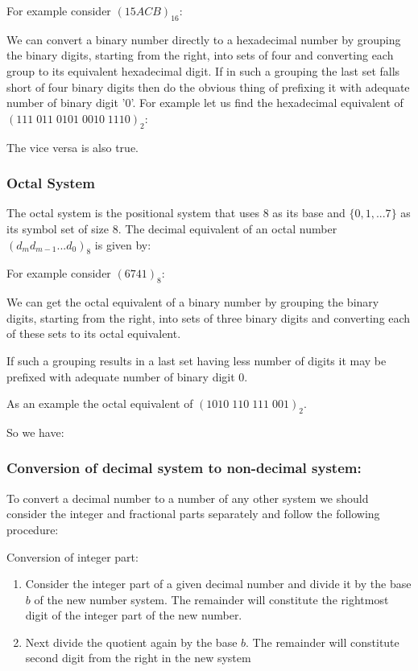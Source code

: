 	 For example consider $(15ACB)_{16}$:
	
	We can convert a binary number directly to a hexadecimal number by grouping the binary digits, starting from the right, into sets of four and converting each group to its equivalent hexadecimal digit. If in such a grouping the last set falls short of four binary digits then do the obvious thing of prefixing it with adequate number of binary digit '$0$'. For example let us find the 	hexadecimal equivalent of $(111\;011\;0101\;0010\;1110)_{2}$:
	
	The vice versa is also true.
	
	\subsubsection{Octal System}  
	The octal system is the positional
	system that uses 8 as its base and $\{0,1,...7\}$ as its symbol set of size 8. The decimal equivalent of an octal number $(d_{m}d_{m-1}...d_{0})_{8}$ is given by:
	
	 For example consider $(6741)_{8}$:
	 
	
	We can get the octal equivalent of a binary number by grouping the binary digits, starting from the right, into sets of three binary digits and converting each of these sets to its octal equivalent.
	
	If such a grouping results in a last set having less number of digits it may be prefixed with adequate number of binary digit 0.
	
	As an example the octal equivalent of $(1010\;110\;111\;001)_{2}$.
	
	So we have:
	
	
	\pagebreak
	\subsubsection{Conversion of decimal system to non-decimal system:}
	To convert a decimal number to a number of any other system we should consider the integer and fractional parts separately and follow the following procedure:
	
	Conversion of integer part:
	\begin{enumerate}
		\item Consider the integer part of a given decimal number and divide it by the base $b$ of the new number system. The remainder will constitute the rightmost digit of the integer part of the new number.

		\item Next divide the quotient again by the base $b$. The remainder will constitute second digit from the right in the new system
	\end{enumerate}
	
